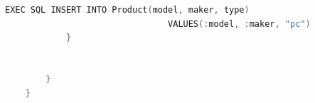 \documentclass[12pt]{article}
\begin{document}
\begin{enumerate}[1.]
\begin{enumerate}[a)]
\begin{lstlisting}[language=c]
                EXEC SQL INSERT INTO Product(model, maker, type)
                                VALUES(:model, :maker, "pc")
            }


        }
    }
    \end{lstlisting}

    \end{enumerate}


\end{enumerate}
\end{document}
